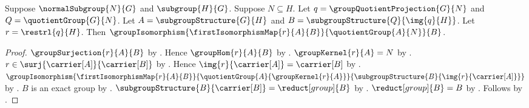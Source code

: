 \begin{theorem}\label{group_quotient_correspondence_induced_isomorphism}
    Suppose $\normalSubgroup{N}{G}$ and $\subgroup{H}{G}$.
    Suppose $N\subseteq H$.
    Let $q=\groupQuotientProjection{G}{N}$ and
        $Q=\quotientGroup{G}{N}$.
    Let $A=\subgroupStructure{G}{H}$ and
        $B=\subgroupStructure{Q}{\img{q}{H}}$.
    Let $r=\restrl{q}{H}$.
    Then
        $\groupIsomorphism
            {\firstIsomorphismMap{r}{A}{B}}
            {\quotientGroup{A}{N}}{B}$.
\end{theorem}
\begin{proof}
    $\groupSurjection{r}{A}{B}$ by
        .
    Hence $\groupHom{r}{A}{B}$ by .
    $\groupKernel{r}{A}=N$ by
        .
    $r\in\surj{\carrier[A]}{\carrier[B]}$ by
        .
    Hence $\img{r}{\carrier[A]}=\carrier[B]$ by
        .
    $\groupIsomorphism
        {\firstIsomorphismMap{r}{A}{B}}
        {\quotientGroup{A}{\groupKernel{r}{A}}}
        {\subgroupStructure{B}{\img{r}{\carrier[A]}}}$ by
        .
    $B$ is an exact group by
        .
    $\subgroupStructure{B}{\carrier[B]}=\reduct[group]{B}$ by
        .
    $\reduct[group]{B}=B$ by .
    Follows by \auto.
\end{proof}

